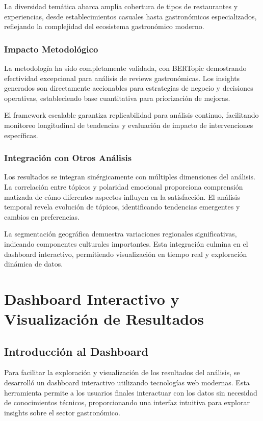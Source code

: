 \documentclass[12pt,a4paper,twoside,openany]{book}
\begin{document}
La diversidad temática abarca amplia cobertura de tipos de restaurantes y experiencias, desde establecimientos casuales hasta gastronómicos especializados, reflejando la complejidad del ecosistema gastronómico moderno.

\subsection{Impacto Metodológico}

La metodología ha sido completamente validada, con BERTopic demostrando efectividad excepcional para análisis de reviews gastronómicas. Los insights generados son directamente accionables para estrategias de negocio y decisiones operativas, estableciendo base cuantitativa para priorización de mejoras.

El framework escalable garantiza replicabilidad para análisis continuo, facilitando monitoreo longitudinal de tendencias y evaluación de impacto de intervenciones específicas.

\subsection{Integración con Otros Análisis}

Los resultados se integran sinérgicamente con múltiples dimensiones del análisis. La correlación entre tópicos y polaridad emocional proporciona comprensión matizada de cómo diferentes aspectos influyen en la satisfacción. El análisis temporal revela evolución de tópicos, identificando tendencias emergentes y cambios en preferencias.

La segmentación geográfica demuestra variaciones regionales significativas, indicando componentes culturales importantes. Esta integración culmina en el dashboard interactivo, permitiendo visualización en tiempo real y exploración dinámica de datos.

\chapter{Dashboard Interactivo y Visualización de Resultados}

\section{Introducción al Dashboard}

Para facilitar la exploración y visualización de los resultados del análisis, se desarrolló un dashboard interactivo utilizando tecnologías web modernas. Esta herramienta permite a los usuarios finales interactuar con los datos sin necesidad de conocimientos técnicos, proporcionando una interfaz intuitiva para explorar insights sobre el sector gastronómico.
\end{document}
